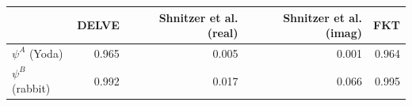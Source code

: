 \begin{tabular}{lrrrr}
\toprule
 & DELVE & Shnitzer et al. (real) & Shnitzer et al. (imag) & FKT \\
\midrule
$\psi^A$ (Yoda) & 0.965 & 0.005 & 0.001 & 0.964 \\
$\psi^B$ (rabbit) & 0.992 & 0.017 & 0.066 & 0.995 \\
\bottomrule
\end{tabular}
